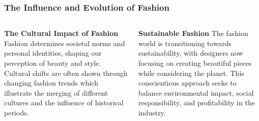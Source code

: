 \documentclass[5pt]{beamer}
\begin{document}
\begin{frame}
\frametitle{The Influence and Evolution of Fashion}
\begin{columns}
\begin{column}{0.45\textwidth}
\begin{block}{\textbf{The Cultural Impact of Fashion}}
Fashion determines societal norms and personal identities, shaping our perception of beauty and style. Cultural shifts are often shown through changing fashion trends which illustrate the merging of different cultures and the influence of historical periods.
\end{block}
\end{column}
\begin{column}{0.45\textwidth}
\begin{block}{\textbf{Sustainable Fashion}}
The fashion world is transitioning towards sustainability, with designers now focusing on creating beautiful pieces while considering the planet. This conscientious approach seeks to balance environmental impact, social responsibility, and profitability in the industry.
\end{block}
\end{column}
\end{columns}
\end{frame}
\end{document}
